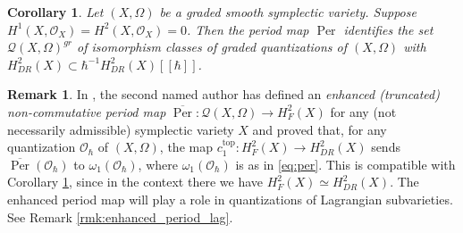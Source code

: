 \documentclass[12pt]{amsart}
\newcommand{\C}{\mathbb{C}}
\newcommand{\quan}{\mathcal{Q}}
\newcommand{\per}{\operatorname{Per}}
\newcommand{\cm}{\C^\times}
\newcommand{\OO}{\mathcal{O}}
\newtheorem{Cor}[Thm]{Corollary}
\theoremstyle{definition}
\newtheorem{defi}[Thm]{Definition}
\newtheorem{Rem}[Thm]{Remark}
\numberwithin{equation}{section}
\begin{document}
\begin{Cor}\label{cor:per_graded}
	Let $(X, \Omega)$ be a graded smooth symplectic variety. Suppose $H^1(X,\OO_X) = H^2(X,\OO_X)=0$. Then the period map $\per$ identifies the set $\quan(X, \Omega)^{gr}$ of isomorphism classes of graded quantizations of $(X,\Omega)$ with $H^2_{DR}(X) \subset  \hbar^{-1}H^2_{DR}(X)[[\hbar]]$.
\end{Cor}


\begin{Rem} \label{rmk:enhanced_period}
	In  \cite{Yu}, the second named author has defined an {\it enhanced (truncated) non-commutative period map} $\overline{\per}: \quan(X, \Omega) \to H^2_F(X)$ for any (not necessarily admissible) symplectic variety $X$ and proved that, for any quantization $\OO_\hbar$ of $(X, \Omega)$, the map $	c_1^{\operatorname{top}}: H^2_F(X) \to H^2_{DR}(X)$ sends $\overline{\per}(\OO_\hbar)$ to $ \omega_1(\OO_\hbar)$, where $\omega_1(\OO_\hbar)$ is as in \eqref{eq:per}. This is compatible with Corollary \ref{cor:per_graded}, since in the context there we have $H^2_F(X) \simeq H^2_{DR}(X)$. The enhanced period map will play a role in quantizations of Lagrangian subvarieties. See Remark \ref{rmk:enhanced_period_lag}.
\end{Rem}

\end{document}

